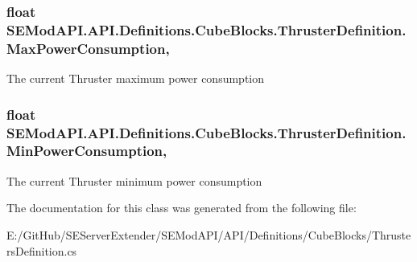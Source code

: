\hypertarget{class_s_e_mod_a_p_i_1_1_a_p_i_1_1_definitions_1_1_cube_blocks_1_1_thruster_definition_afbbbc982d9271bf6f2da319da396fe18}{}
\subsubsection[{Max\+Power\+Consumption}]{\setlength{\rightskip}{0pt plus 5cm}float S\+E\+Mod\+A\+P\+I.\+A\+P\+I.\+Definitions.\+Cube\+Blocks.\+Thruster\+Definition.\+Max\+Power\+Consumption\hspace{0.3cm}{\ttfamily [get]}, {\ttfamily [set]}}\label{class_s_e_mod_a_p_i_1_1_a_p_i_1_1_definitions_1_1_cube_blocks_1_1_thruster_definition_afbbbc982d9271bf6f2da319da396fe18}


The current Thruster maximum power consumption 

\hypertarget{class_s_e_mod_a_p_i_1_1_a_p_i_1_1_definitions_1_1_cube_blocks_1_1_thruster_definition_a4dbd839846ea68c5bf5b786d16e61c9e}{}
\subsubsection[{Min\+Power\+Consumption}]{\setlength{\rightskip}{0pt plus 5cm}float S\+E\+Mod\+A\+P\+I.\+A\+P\+I.\+Definitions.\+Cube\+Blocks.\+Thruster\+Definition.\+Min\+Power\+Consumption\hspace{0.3cm}{\ttfamily [get]}, {\ttfamily [set]}}\label{class_s_e_mod_a_p_i_1_1_a_p_i_1_1_definitions_1_1_cube_blocks_1_1_thruster_definition_a4dbd839846ea68c5bf5b786d16e61c9e}


The current Thruster minimum power consumption 



The documentation for this class was generated from the following file\+:\begin{DoxyCompactItemize}
\item 
E\+:/\+Git\+Hub/\+S\+E\+Server\+Extender/\+S\+E\+Mod\+A\+P\+I/\+A\+P\+I/\+Definitions/\+Cube\+Blocks/Thrusters\+Definition.\+cs\end{DoxyCompactItemize}
